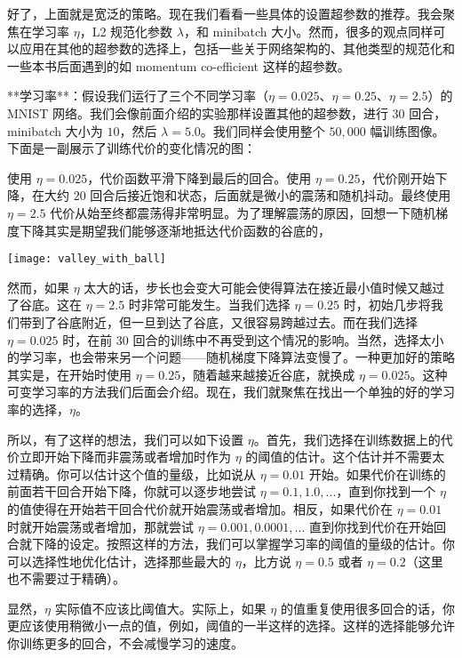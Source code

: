 好了，上面就是宽泛的策略。现在我们看看一些具体的设置超参数的推荐。我会聚焦在学习率 $\eta$，L2 规范化参数 $\lambda$，和 minibatch 大小。然而，很多的观点同样可以应用在其他的超参数的选择上，包括一些关于网络架构的、其他类型的规范化和一些本书后面遇到的如 momentum co-efficient 这样的超参数。

**学习率**：假设我们运行了三个不同学习率（$\eta=0.025$、$\eta=0.25$、$\eta=2.5$）的 MNIST 网络。我们会像前面介绍的实验那样设置其他的超参数，进行 $30$ 回合，minibatch 大小为 $10$，然后 $\lambda = 5.0$。我们同样会使用整个 $50,000$ 幅训练图像。下面是一副展示了训练代价的变化情况的图：

使用 $\eta=0.025$，代价函数平滑下降到最后的回合。使用 $\eta=0.25$，代价刚开始下降，在大约 $20$ 回合后接近饱和状态，后面就是微小的震荡和随机抖动。最终使用 $\eta=2.5$ 代价从始至终都震荡得非常明显。为了理解震荡的原因，回想一下随机梯度下降其实是期望我们能够逐渐地抵达代价函数的谷底的，
\begin{center}
  \texttt{[image: valley\_with\_ball]}
\end{center}

然而，如果 $\eta$ 太大的话，步长也会变大可能会使得算法在接近最小值时候又越过了谷底。这在 $\eta=2.5$ 时非常可能发生。当我们选择 $\eta=0.25$ 时，初始几步将我们带到了谷底附近，但一旦到达了谷底，又很容易跨越过去。而在我们选择 $\eta=0.025$ 时，在前 $30$ 回合的训练中不再受到这个情况的影响。当然，选择太小的学习率，也会带来另一个问题——随机梯度下降算法变慢了。一种更加好的策略其实是，在开始时使用 $\eta=0.25$，随着越来越接近谷底，就换成 $\eta=0.025$。这种可变学习率的方法我们后面会介绍。现在，我们就聚焦在找出一个单独的好的学习率的选择，$\eta$。

所以，有了这样的想法，我们可以如下设置 $\eta$。首先，我们选择在训练数据上的代价立即开始下降而非震荡或者增加时作为 $\eta$ 的阈值的估计。这个估计并不需要太过精确。你可以估计这个值的量级，比如说从 $\eta=0.01$ 开始。如果代价在训练的前面若干回合开始下降，你就可以逐步地尝试 $\eta=0.1, 1.0,...$，直到你找到一个 $\eta$ 的值使得在开始若干回合代价就开始震荡或者增加。相反，如果代价在 $\eta=0.01$ 时就开始震荡或者增加，那就尝试 $\eta=0.001, 0.0001,...$ 直到你找到代价在开始回合就下降的设定。按照这样的方法，我们可以掌握学习率的阈值的量级的估计。你可以选择性地优化估计，选择那些最大的 $\eta$，比方说 $\eta=0.5$ 或者 $\eta=0.2$（这里也不需要过于精确）。

显然，$\eta$ 实际值不应该比阈值大。实际上，如果 $\eta$ 的值重复使用很多回合的话，你更应该使用稍微小一点的值，例如，阈值的一半这样的选择。这样的选择能够允许你训练更多的回合，不会减慢学习的速度。

